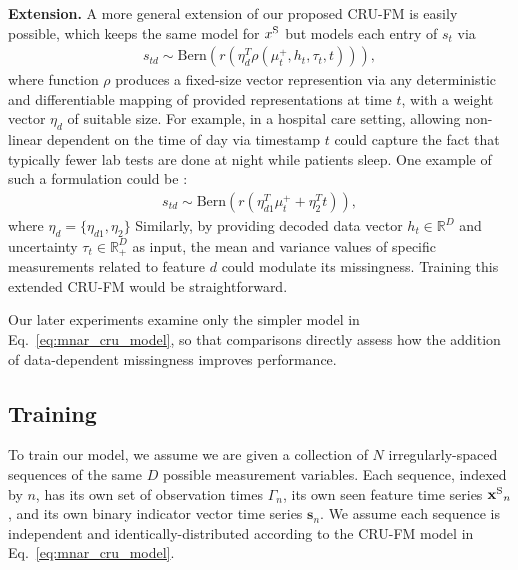 \textbf{Extension.}
A more general extension of our proposed CRU-FM is easily possible, which keeps the same model for $x^{\text{S}}$ but models each entry of $s_t$ via
\begin{align}
    s_{td} \sim \text{Bern}( r(\eta_d^T \rho(\mu^+_t, h_t, \tau_t, t) )),
    \label{eq:extended_mnar_cru_model}
\end{align}
where function $\rho$ produces a fixed-size vector represention via any deterministic and differentiable mapping of provided representations at time $t$, with a weight vector $\eta_d$ of suitable size. For example, in a hospital care setting, allowing non-linear dependent on the time of day via timestamp $t$ could
capture the fact that typically fewer lab tests are done at night while patients sleep. One example of such a formulation could be : 
\begin{align}
    s_{td} \sim \text{Bern}(r(\eta_{d1}^T\mu_t^+ + \eta_2^Tt)),
    \label{eq:extended_mnar_cru_model_example}
\end{align}
where $\eta_d=\{\eta_{d1}, \eta_{2}\}$
Similarly, by providing decoded data vector $h_t \in \mathbb{R}^D$ and uncertainty $\tau_t \in \mathbb{R}_{+}^D$ as input, the mean and variance values of specific measurements related to feature $d$ could modulate its missingness.  Training this extended CRU-FM would be straightforward. %

Our later experiments examine only the simpler model in Eq.~\eqref{eq:mnar_cru_model}, so that comparisons directly assess how the addition of data-dependent missingness improves performance.


\subsection{Training}

To train our model, we assume we are given a collection of $N$ irregularly-spaced sequences of the same $D$ possible measurement variables. Each sequence, indexed by $n$, has its own set of observation times $\Gamma_n$, its own seen feature time series $\mathbf{x^{\text{S}}}_n$, and its own binary indicator vector time series $\mathbf{s}_n$. We assume each sequence is independent and identically-distributed according to the CRU-FM model in Eq.~\eqref{eq:mnar_cru_model}.

